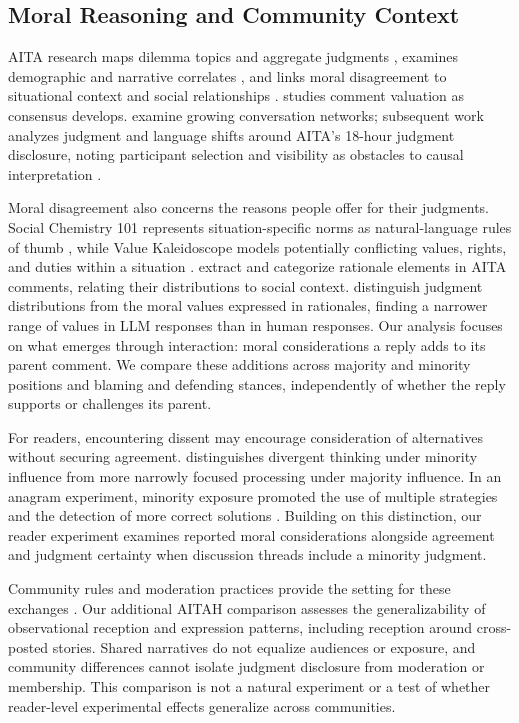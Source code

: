 \subsection{Moral Reasoning and Community Context}
\label{subsec:related-aita}

AITA research maps dilemma topics and aggregate judgments \cite{nguyen2022mapping,yudkin2025large}, examines demographic and narrative correlates \cite{decandia2022socialnorms,giorgi2023author}, and links moral disagreement to situational context and social relationships \cite{shi2025moral}. \citet{mellody2025consensus} studies comment valuation as consensus develops. \citet{goglia2024structure} examine growing conversation networks; subsequent work analyzes judgment and language shifts around AITA's 18-hour judgment disclosure, noting participant selection and visibility as obstacles to causal interpretation \cite{goglia2026influence}.

Moral disagreement also concerns the reasons people offer for their judgments. Social Chemistry 101 represents situation-specific norms as natural-language rules of thumb \cite{forbes2020social}, while Value Kaleidoscope models potentially conflicting values, rights, and duties within a situation \cite{sorensen2024value}. \citet{xi2024morality} extract and categorize rationale elements in AITA comments, relating their distributions to social context. \citet{russo2026pluralistic} distinguish judgment distributions from the moral values expressed in rationales, finding a narrower range of values in LLM responses than in human responses. Our analysis focuses on what emerges through interaction: moral considerations a reply adds to its parent comment. We compare these additions across majority and minority positions and blaming and defending stances, independently of whether the reply supports or challenges its parent.

For readers, encountering dissent may encourage consideration of alternatives without securing agreement. \citet{nemeth1986differential} distinguishes divergent thinking under minority influence from more narrowly focused processing under majority influence. In an anagram experiment, minority exposure promoted the use of multiple strategies and the detection of more correct solutions \cite{nemeth1987divergent}. Building on this distinction, our reader experiment examines reported moral considerations alongside agreement and judgment certainty when discussion threads include a minority judgment.

Community rules and moderation practices provide the setting for these exchanges \cite{fiesler2018rules,matias2019norms}. Our additional AITAH comparison assesses the generalizability of observational reception and expression patterns, including reception around cross-posted stories. Shared narratives do not equalize audiences or exposure, and community differences cannot isolate judgment disclosure from moderation or membership. This comparison is not a natural experiment or a test of whether reader-level experimental effects generalize across communities.
